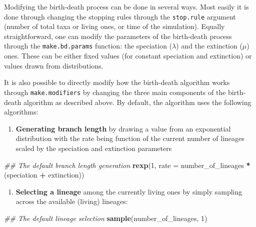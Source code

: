 \documentclass[
]{article}
\newenvironment{Shaded}{\begin{snugshade}}{\end{snugshade}}
\newcommand{\CommentTok}[1]{\textcolor[rgb]{0.56,0.35,0.01}{\textit{#1}}}
\newcommand{\DataTypeTok}[1]{\textcolor[rgb]{0.13,0.29,0.53}{#1}}
\newcommand{\DecValTok}[1]{\textcolor[rgb]{0.00,0.00,0.81}{#1}}
\newcommand{\KeywordTok}[1]{\textcolor[rgb]{0.13,0.29,0.53}{\textbf{#1}}}
\newcommand{\NormalTok}[1]{#1}
\newcommand{\OperatorTok}[1]{\textcolor[rgb]{0.81,0.36,0.00}{\textbf{#1}}}
\newcommand{\StringTok}[1]{\textcolor[rgb]{0.31,0.60,0.02}{#1}}
\providecommand{\tightlist}{%
  \setlength{\itemsep}{0pt}\setlength{\parskip}{0pt}}
\begin{document}
Modifying the birth-death process can be done in several ways. Most
easily it is done through changing the stopping rules through the
\texttt{stop.rule} argument (number of total taxa or living ones, or
time of the simulation). Equally straightforward, one can modify the
parameters of the birth-death process through the
\texttt{make.bd.params} function: the speciation (\(\lambda\)) and the
extinction (\(\mu\)) ones. These can be either fixed values (for
constant speciation and extinction) or values drawn from distributions.

It is also possible to directly modify how the birth-death algorithm
works through \texttt{make.modifiers} by changing the three main
components of the birth-death algorithm as described above. By default,
the algorithm uses the following algorithms:

\begin{enumerate}
\def\labelenumi{\arabic{enumi}.}
\tightlist
\item
  \textbf{Generating branch length} by drawing a value from an
  exponential distribution with the rate being function of the current
  number of lineages scaled by the speciation and extinction parameters
\end{enumerate}

\begin{Shaded}
\begin{Highlighting}[]
\CommentTok{\#\# The default branch length generation}
\KeywordTok{rexp}\NormalTok{(}\DecValTok{1}\NormalTok{, }\DataTypeTok{rate =}\NormalTok{ number\_of\_lineages }\OperatorTok{*}\StringTok{ }\NormalTok{(speciation }\OperatorTok{+}\StringTok{ }\NormalTok{extinction))}
\end{Highlighting}
\end{Shaded}

\begin{enumerate}
\def\labelenumi{\arabic{enumi}.}
\setcounter{enumi}{1}
\tightlist
\item
  \textbf{Selecting a lineage} among the currently living ones by simply
  sampling across the available (living) lineages:
\end{enumerate}

\begin{Shaded}
\begin{Highlighting}[]
\CommentTok{\#\# The default lineage selection}
\KeywordTok{sample}\NormalTok{(number\_of\_lineages, }\DecValTok{1}\NormalTok{)}
\end{Highlighting}
\end{Shaded}
\end{document}
